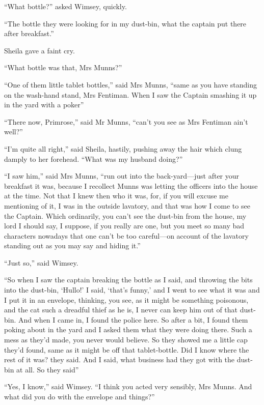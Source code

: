 \enquote{What bottle?} asked Wimsey, quickly.

\enquote{The bottle they were looking for in my dust-bin, what the captain put there after breakfast.}

Sheila gave a faint cry.

\enquote{What bottle was that, Mrs Munns?}

\enquote{One of them little tablet bottles,} said Mrs Munns, \enquote{same as you have standing on the wash-hand stand, Mrs Fentiman. When I saw the Captain smashing it up in the yard with a poker\longdash}

\enquote{There now, Primrose,} said Mr Munns, \enquote{can't you see as Mrs Fentiman ain't well?}

\enquote{I'm quite all right,} said Sheila, hastily, pushing away the hair which clung damply to her forehead. \enquote{What was my husband doing?}

\enquote{I saw him,} said Mrs Munns, \enquote{run out into the back-yard\allowbreak---\allowbreak just after your breakfast it was, because I recollect Munns was letting the officers into the house at the time. Not that I knew then who it was, for, if you will excuse me mentioning of it, I was in the outside lavatory, and that was how I come to see the Captain. Which ordinarily, you can't see the dust-bin from the house, my lord I should say, I suppose, if you really are one, but you meet so many bad characters nowadays that one can't be too careful\allowbreak---\allowbreak on account of the lavatory standing out as you may say and hiding it.}

\enquote{Just so,} said Wimsey.

\enquote{So when I saw the captain breaking the bottle as I said, and throwing the bits into the dust-bin, \enquote{Hullo!} I said, \enquote{that's funny,} and I went to see what it was and I put it in an envelope, thinking, you see, as it might be something poisonous, and the cat such a dreadful thief as he is, I never can keep him out of that dust-bin. And when I came in, I found the police here. So after a bit, I found them poking about in the yard and I asked them what they were doing there. Such a mess as they'd made, you never would believe. So they showed me a little cap they'd found, same as it might be off that tablet-bottle. Did I know where the rest of it was? they said. And I said, what business had they got with the dust-bin at all. So they said\longdash}

\enquote{Yes, I know,} said Wimsey. \enquote{I think you acted very sensibly, Mrs Munns. And what did you do with the envelope and things?}

